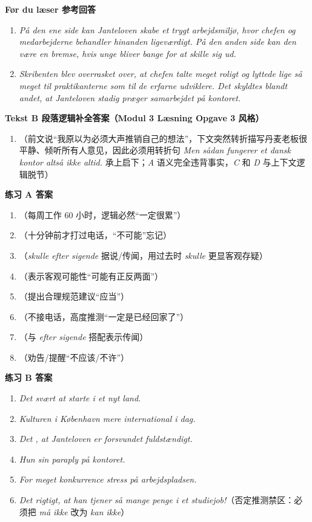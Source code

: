 \begin{answerbox}
\textbf{Før du læser 参考回答}
\begin{enumerate}
  \item \textit{På den ene side kan Janteloven skabe et trygt arbejdsmiljø, hvor chefen og medarbejderne behandler hinanden ligeværdigt. På den anden side kan den være en bremse, hvis unge bliver bange for at skille sig ud.}
  \item \textit{Skribenten blev overrasket over, at chefen talte meget roligt og lyttede lige så meget til praktikanterne som til de erfarne udviklere. Det skyldtes blandt andet, at Janteloven stadig præger samarbejdet på kontoret.}
\end{enumerate}

\textbf{Tekst B 段落逻辑补全答案（Modul 3 Læsning Opgave 3 风格）}
\begin{enumerate}
  \item[] （前文说“我原以为必须大声推销自己的想法”，下文突然转折描写丹麦老板很平静、倾听所有人意见，因此必须用转折句 \textit{Men sådan fungerer et dansk kontor altså ikke altid.} 承上启下；\textit{A} 语义完全违背事实，\textit{C} 和 \textit{D} 与上下文逻辑脱节）
\end{enumerate}

\textbf{练习 A 答案}
\begin{enumerate}
  \item {}（每周工作 60 小时，逻辑必然“一定很累”）
  \item {}（十分钟前才打过电话，“不可能”忘记）
  \item {}（\textit{skulle efter sigende} 据说/传闻，用过去时 \textit{skulle} 更显客观存疑）
  \item {}（表示客观可能性“可能有正反两面”）
  \item {}（提出合理规范建议“应当”）
  \item {}（不接电话，高度推测“一定是已经回家了”）
  \item {}（与 \textit{efter sigende} 搭配表示传闻）
  \item {}（劝告/提醒“不应该/不许”）
\end{enumerate}

\textbf{练习 B 答案}
\begin{enumerate}
  \item \textit{Det  svært at starte i et nyt land.}
  \item \textit{Kulturen i København  mere international i dag.}
  \item \textit{Det , at Janteloven er forsvundet fuldstændigt.}
  \item \textit{Hun  sin paraply på kontoret.}
  \item \textit{For meget konkurrence  stress på arbejdspladsen.}
  \item \textit{Det  rigtigt, at han tjener så mange penge i et studiejob!}（否定推测禁区：必须把 \textit{må ikke} 改为 \textit{kan ikke}）
\end{enumerate}


\end{answerbox}
